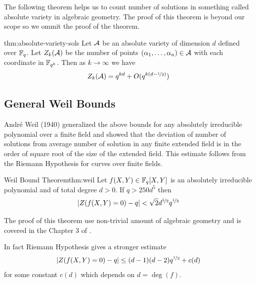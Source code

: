 The following theorem helps us to count number of solutions in something called absolute variety in algebraic geometry. The proof of this theorem is beyond our scope so we ommit the proof of the theorem. 
\begin{Theorem}{}{thm:absolute-variety-sols}
  Let $\mathcal{A}$ be an absolute variety of dimension $d$ defined over $\mathbb{F}_q$. Let $Z_k(\mathcal{A})$ be the number of points $(\alpha_1,\dots, \alpha_n)\in\mathcal{A}$ with each coordinate in $\mathbb{F}_{q^k}$. Then as $k\to \infty$ we have $$Z_k(\mathcal{A})=q^{kd}+O(q^{k(d-\nicefrac12)})$$
\end{Theorem}

\subsection{General Weil Bounds}
Andr\'{e} Weil (1940) generalized the above bounds for any absolutely irreducible polynomial over a finite field and showed that the deviation of number of solutions from average number of solution in any finite extended field is in the order of square root of the size of the extended field. This estimate follows from the Riemann Hypothesis for curves over finite fields.
\begin{Theorem}{Weil Bound Theorem}{thm:weil}
  Let $f(X,Y)\in\mathbb{F}_q[X,Y]$ is an absolutely irreducible polynomial and of total degree $d>0$. If $q>250d^5$ then $$|Z(f(X,Y)=0)-q|<\sqrt{2}d^{\nicefrac52}q^{\nicefrac12}$$
\end{Theorem}
The proof of this theorem use non-trivial amount of algebraic geometry and is covered in the Chapter 3 of \cite{Schmidt1976}. 

In fact Riemann Hypothesis gives a stronger estimate $$|Z(f(X,Y)=0)-q|\leq (d-1)(d-2)q^{\nicefrac12}+c(d)$$ for some constant $c(d)$ which depends on $d=\deg(f)$. 